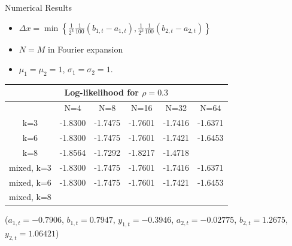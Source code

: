 \documentclass{beamer}
\begin{document}
\begin{frame}{Numerical Results}

\begin{itemize}
	\item $\Delta x = \min\left\{ \frac{1}{2^k} \frac{1}{100} (b_{1,t} - a_{1,t}), \frac{1}{2^k} \frac{1}{100} (b_{2,t} - a_{2,t}) \right\}$

	\item $N = M$ in Fourier expansion
	\item $\mu_1 = \mu_2 = 1$, $\sigma_1 = \sigma_2 = 1$. 
\end{itemize}

\pause
\begin{centering}
\begin{tabular}{|c|c|c|c|c|c|}
\multicolumn{6}{c}{Log-likelihood for $\rho = 0.3$} \\\hline
		& N=4 & N=8 & N=16 & N=32 & N=64  \\\hline
k=3 &-1.8300 & -1.7475 & -1.7601 & -1.7416 & -1.6371 \\\hline
k=6 & -1.8300 & -1.7475 & -1.7601 & -1.7421 & -1.6453 \\\hline
k=8 & -1.8564 & -1.7292 & -1.8217 & -1.4718 & \cellcolor{red!50}{$-\infty$} \\\hline \hline
mixed, k=3 & -1.8300 & -1.7475 & -1.7601 & -1.7416 & -1.6371 \\\hline
mixed, k=6 & -1.8300 & -1.7475 & -1.7601 & -1.7421 & -1.6453 \\\hline
mixed, k=8 & \cellcolor{blue!50}{-1.8300} & \cellcolor{blue!40}{-1.7475} & \cellcolor{blue!30}{-1.7601}	& \cellcolor{blue!20}{-1.7416} & \cellcolor{blue!10}{-1.6365} \\\hline
\end{tabular}
\end{centering}

\vspace{1mm}
($a_{1,t} = -0.7906$, $b_{1,t} = 0.7947$, $y_{1,t} = -0.3946$, $a_{2,t}=-0.02775$, $b_{2,t} = 1.2675$, $y_{2,t} = 1.06421$)

\end{frame}
\end{document}
